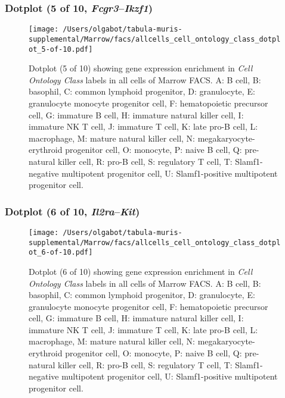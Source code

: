 \subsubsection{Dotplot (5 of 10, \emph{Fcgr3}--\emph{Ikzf1})}
\begin{figure}[h]
\centering
\texttt{[image: /Users/olgabot/tabula-muris-supplemental/Marrow/facs/allcells\_cell\_ontology\_class\_dotplot\_5-of-10.pdf]}

\caption{ Dotplot (5 of 10)  showing gene expression enrichment in \emph{Cell Ontology Class} labels in all cells of Marrow FACS. A: B cell, B: basophil, C: common lymphoid progenitor, D: granulocyte, E: granulocyte monocyte progenitor cell, F: hematopoietic precursor cell, G: immature B cell, H: immature natural killer cell, I: immature NK T cell, J: immature T cell, K: late pro-B cell, L: macrophage, M: mature natural killer cell, N: megakaryocyte-erythroid progenitor cell, O: monocyte, P: naive B cell, Q: pre-natural killer cell, R: pro-B cell, S: regulatory T cell, T: Slamf1-negative multipotent progenitor cell, U: Slamf1-positive multipotent progenitor cell.}
\end{figure}


\clearpage

\subsubsection{Dotplot (6 of 10, \emph{Il2ra}--\emph{Kit})}
\begin{figure}[h]
\centering
\texttt{[image: /Users/olgabot/tabula-muris-supplemental/Marrow/facs/allcells\_cell\_ontology\_class\_dotplot\_6-of-10.pdf]}

\caption{ Dotplot (6 of 10)  showing gene expression enrichment in \emph{Cell Ontology Class} labels in all cells of Marrow FACS. A: B cell, B: basophil, C: common lymphoid progenitor, D: granulocyte, E: granulocyte monocyte progenitor cell, F: hematopoietic precursor cell, G: immature B cell, H: immature natural killer cell, I: immature NK T cell, J: immature T cell, K: late pro-B cell, L: macrophage, M: mature natural killer cell, N: megakaryocyte-erythroid progenitor cell, O: monocyte, P: naive B cell, Q: pre-natural killer cell, R: pro-B cell, S: regulatory T cell, T: Slamf1-negative multipotent progenitor cell, U: Slamf1-positive multipotent progenitor cell.}
\end{figure}


\clearpage

